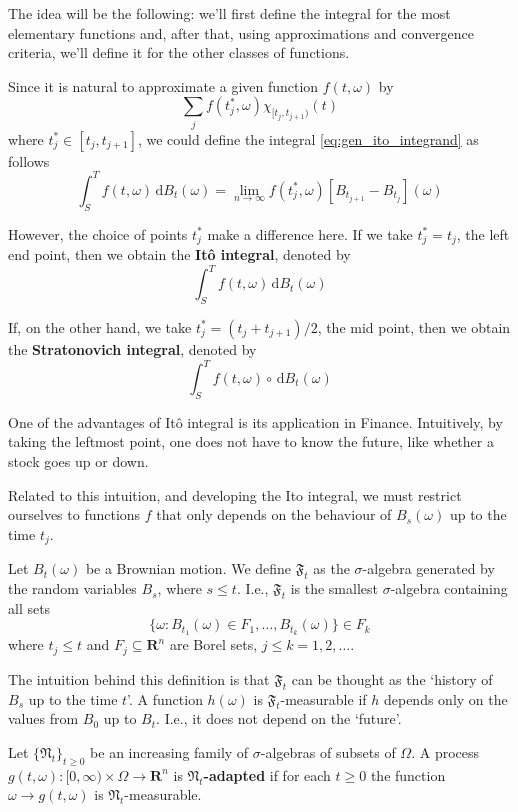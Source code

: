 The idea will be the following: we'll first define the integral for the most elementary functions and, after that, using approximations and convergence criteria, we'll define it for the other classes of functions.

Since it is natural to approximate a given function $f(t, \omega)$ by
\[
	\sum_j f(t_j^\ast, \omega) \chi_{[t_j, t_{j+1})}(t)
\]
where $t_j^\ast \in [t_j, t_{j+1}]$, we could define the integral \eqref{eq:gen_ito_integrand} as follows
\[
	\int_S^T f(t, \omega) \, \mathrm{d}B_t(\omega) = \lim_{n \to \infty} f(t_j^\ast,\omega) [B_{t_{j+1}} - B_{t_j}](\omega)
\]

However, the choice of points $t_j^\ast$ make a difference here. If we take $t_j^\ast = t_j$, the left end point, then we obtain the \textbf{Itô integral}, denoted by
\[
	\int_S^T f(t, \omega) \, \mathrm{d}B_t(\omega)
\]

If, on the other hand, we take $t_j^\ast = (t_j + t_{j+1})/2$, the mid point, then we obtain the \textbf{Stratonovich integral}, denoted by
\[
	\int_S^T f(t, \omega) \circ \, \mathrm{d}B_t(\omega)
\]

One of the advantages of Itô integral is its application in Finance. Intuitively, by taking the leftmost point, one does not have to know the future, like whether a stock goes up or down.

Related to this intuition, and developing the Ito integral, we must restrict ourselves to functions $f$ that only depends on the behaviour of $B_s(\omega)$ up to the time $t_j$. 

\begin{definition}
	Let $B_t(\omega)$ be a Brownian motion. We define $\mathfrak{F}_t$ as the $\sigma$-algebra generated by the random variables $B_s$, where $s \leq t$. I.e., $\mathfrak{F}_t$ is the smallest $\sigma$-algebra containing all sets
	\[
		\{ \omega : B_{t_1}(\omega) \in F_1, \ldots, B_{t_k}(\omega) \} \in F_k
	\]
	where $t_j \leq t$ and $F_j \subseteq \textbf{R}^n$ are Borel sets, $j \leq k = 1, 2, \ldots$.
\end{definition}

The intuition behind this definition is that $\mathfrak{F}_t$ can be thought as the `history of $B_s$ up to the time $t$'. A function $h(\omega)$ is $\mathfrak{F}_t$-measurable if $h$ depends only on the values from $B_0$ up to $B_t$. I.e., it does not depend on the `future'. 

\begin{definition}
	Let $\{ \mathfrak{N}_t \}_{t \geq 0}$ be an increasing family of $\sigma$-algebras of subsets of $\Omega$. A process $g(t,\omega) : [0, \infty) \times \Omega \longrightarrow \textbf{R}^n$ is \textbf{$\mathfrak{N}_t$-adapted} if for each $t \geq 0$ the function $\omega \longrightarrow g(t,\omega)$ is $\mathfrak{N}_t$-measurable.
\end{definition}

